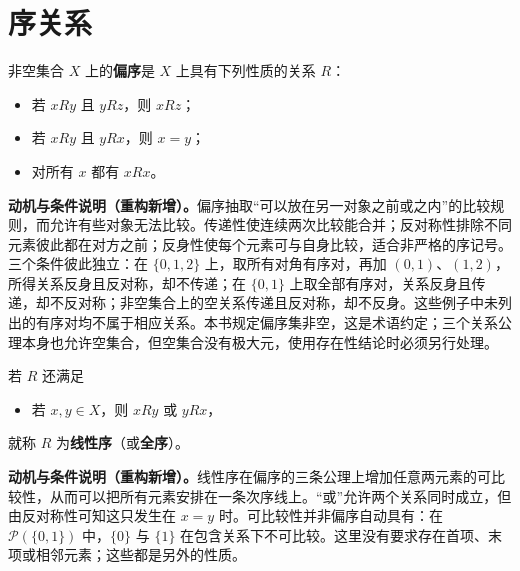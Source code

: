 \documentclass[../../main.tex]{subfiles}%
\begin{document}
\section{序关系}\label{section:ch00-orderings}

\begin{definition}[偏序]\label{definition:ch00-partial-order}
非空集合 $X$ 上的\textbf{偏序}是 $X$ 上具有下列性质的关系 $R$：
\begin{itemize}
\item 若 $xRy$ 且 $yRz$，则 $xRz$；
\item 若 $xRy$ 且 $yRx$，则 $x=y$；
\item 对所有 $x$ 都有 $xRx$。
\end{itemize}
\end{definition}
\begin{remark}
\textbf{动机与条件说明（重构新增）。}偏序抽取“可以放在另一对象之前或之内”的比较规则，而允许有些对象无法比较。传递性使连续两次比较能合并；反对称性排除不同元素彼此都在对方之前；反身性使每个元素可与自身比较，适合非严格的序记号。三个条件彼此独立：在 $\{0,1,2\}$ 上，取所有对角有序对，再加 $(0,1)$、$(1,2)$，所得关系反身且反对称，却不传递；在 $\{0,1\}$ 上取全部有序对，关系反身且传递，却不反对称；非空集合上的空关系传递且反对称，却不反身。这些例子中未列出的有序对均不属于相应关系。本书规定偏序集非空，这是术语约定；三个关系公理本身也允许空集合，但空集合没有极大元，使用存在性结论时必须另行处理。
\end{remark}



\begin{definition}[线性序]\label{definition:ch00-linear-order}
若 $R$ 还满足
\begin{itemize}
\item 若 $x,y\in X$，则 $xRy$ 或 $yRx$，
\end{itemize}
就称 $R$ 为\textbf{线性序}（或\textbf{全序}）。
\end{definition}
\begin{remark}
\textbf{动机与条件说明（重构新增）。}线性序在偏序的三条公理上增加任意两元素的可比较性，从而可以把所有元素安排在一条次序线上。“或”允许两个关系同时成立，但由反对称性可知这只发生在 $x=y$ 时。可比较性并非偏序自动具有：在 $\mathscr{P}(\{0,1\})$ 中，$\{0\}$ 与 $\{1\}$ 在包含关系下不可比较。这里没有要求存在首项、末项或相邻元素；这些都是另外的性质。
\end{remark}
\end{document}
